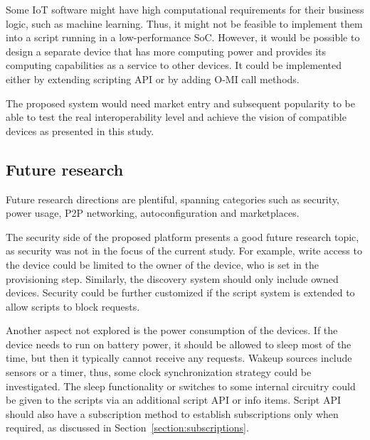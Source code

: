 Some IoT software might have high computational requirements for their business logic, such as machine learning. Thus, it might not be feasible to implement them into a script running in a low-performance SoC. However, it would be possible to design a separate device that has more computing power and provides its computing capabilities as a service to other devices. It could be implemented either by extending scripting API or by adding O-MI call methods.

The proposed system would need market entry and subsequent popularity to be able to test the real interoperability level and achieve the vision of compatible devices as presented in this study.



\subsection*{Future research}


Future research directions are plentiful, spanning categories such as security, power usage, P2P networking, autoconfiguration and marketplaces.


The security side of the proposed platform presents a good future research topic, as security was not in the focus of the current study. For example, write access to the device could be limited to the owner of the device, who is set in the provisioning step. Similarly, the discovery system should only include owned devices. Security could be further customized if the script system is extended to allow scripts to block requests.

Another aspect not explored is the power consumption of the devices. If the device needs to run on battery power, it should be allowed to sleep most of the time, but then it typically cannot receive any requests. Wakeup sources include sensors or a timer, thus, some clock synchronization strategy could be investigated. The sleep functionality or switches to some internal circuitry could be given to the scripts via an additional script API or info items. Script API should also have a subscription method to establish subscriptions only when required, as discussed in Section~\ref{section:subscriptions}.

